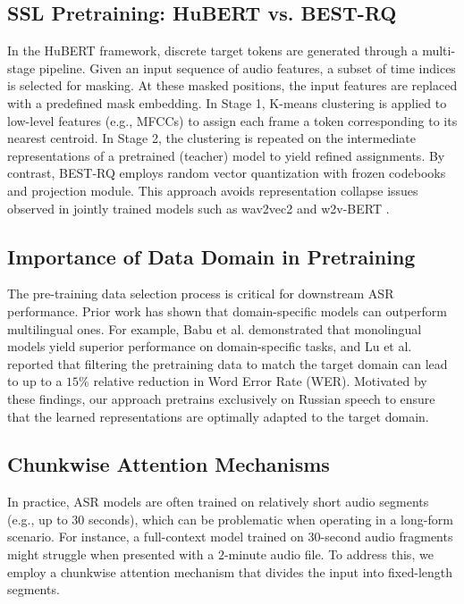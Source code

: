 \documentclass{Interspeech}
\begin{document}
\subsection{SSL Pretraining: HuBERT vs. BEST-RQ}

In the HuBERT framework, discrete target tokens are generated through a multi-stage pipeline. Given an input sequence of audio features,
a subset of time indices is selected for masking.
At these masked positions, the input features are replaced with a predefined mask embedding. In Stage 1, K-means clustering is applied to low-level features (e.g., MFCCs) to assign each frame a token corresponding to its nearest centroid. In Stage 2, the clustering is repeated on the intermediate representations of a pretrained (teacher) model to yield refined assignments. By contrast, BEST-RQ employs random vector quantization with frozen codebooks and projection module. This approach avoids representation collapse issues observed in jointly trained models such as wav2vec2 \cite{wav2vec2} and w2v-BERT \cite{w2v-bert}.

\subsection{Importance of Data Domain in Pretraining}

The pre-training data selection process is critical for downstream ASR performance. Prior work has shown that domain-specific models can outperform multilingual ones. For example, Babu et al. \cite{xlsr} demonstrated that monolingual models yield superior performance on domain-specific tasks, and Lu et al. \cite{google_data_selection} reported that filtering the pretraining data to match the target domain can lead to up to a $15\%$ relative reduction in Word Error Rate (WER). Motivated by these findings, our approach pretrains exclusively on Russian speech to ensure that the learned representations are optimally adapted to the target domain.

\subsection{Chunkwise Attention Mechanisms}

In practice, ASR models are often trained on relatively short audio segments (e.g., up to $30$ seconds), which can be problematic when operating in a long-form scenario. For instance, a full-context model trained on $30$-second audio fragments might struggle when presented with a $2$-minute audio file. To address this, we employ a chunkwise attention mechanism that divides the input into fixed-length segments.
\end{document}
